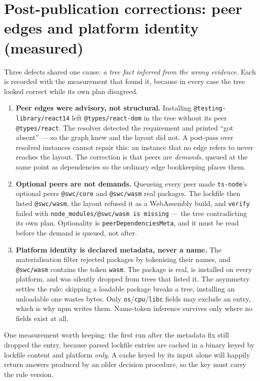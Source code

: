 \documentclass[
  11pt,
  letterpaper,
]{article}
\begin{document}
\section{Post-publication corrections: peer edges and platform identity (measured)}

Three defects shared one cause: \emph{a tree fact inferred from the wrong evidence}. Each is recorded
with the measurement that found it, because in every case the tree looked correct while its own plan
disagreed.

\begin{enumerate}
\item \textbf{Peer edges were advisory, not structural.} Installing \texttt{@testing-library/react\@14}
left \texttt{@types/react-dom} in the tree without its peer \texttt{@types/react}. The resolver
detected the requirement and printed ``got absent'' --- so the graph knew and the layout did not. A
post-pass over resolved instances cannot repair this: an instance that no edge refers to never
reaches the layout. The correction is that peers are \emph{demands}, queued at the same point as
dependencies so the ordinary edge bookkeeping places them.
\item \textbf{Optional peers are not demands.} Queueing every peer made \texttt{ts-node}'s optional
peers \texttt{@swc/core} and \texttt{@swc/wasm} real packages. The lockfile then listed
\texttt{@swc/wasm}, the layout refused it as a WebAssembly build, and \texttt{verify} failed with
\texttt{node_modules/@swc/wasm is missing} --- the tree contradicting its own plan. Optionality is
\texttt{peerDependenciesMeta}, and it must be read before the demand is queued, not after.
\item \textbf{Platform identity is declared metadata, never a name.} The materialisation filter
rejected packages by tokenising their names, and \texttt{@swc/wasm} contains the token \texttt{wasm}.
The package is real, is installed on every platform, and was silently dropped from trees that listed
it. The asymmetry settles the rule: skipping a loadable package breaks a tree, installing an
unloadable one wastes bytes. Only \texttt{os}/\texttt{cpu}/\texttt{libc} fields may exclude an entry,
which is why npm writes them. Name-token inference survives only where no fields exist at all.
\end{enumerate}

One measurement worth keeping: the first run after the metadata fix still dropped the entry, because
parsed lockfile entries are cached in a binary keyed by lockfile content and platform \emph{only}. A
cache keyed by its input alone will happily return answers produced by an older decision procedure,
so the key must carry the rule version.
\end{document}
